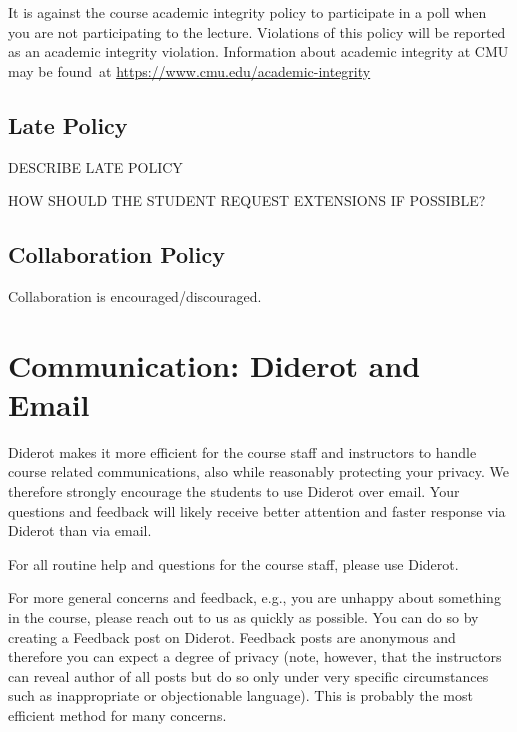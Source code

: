 \begin{gram}
It is against the course academic integrity policy to participate in a poll when you are not participating to the lecture. 
%
Violations of this policy will be reported as an academic integrity violation. Information about academic integrity at CMU may be found at \href{https://www.cmu.edu/academic-integrity}{https://www.cmu.edu/academic-integrity}
\end{gram}

\subsection{Late Policy}

DESCRIBE LATE POLICY

HOW SHOULD THE STUDENT REQUEST EXTENSIONS IF POSSIBLE?

\subsection{ Collaboration Policy}

Collaboration is encouraged/discouraged.


\section{Communication: Diderot and Email}

\begin{gram}
Diderot makes it more efficient for the course staff and instructors
to handle course related communications, also while reasonably
protecting your privacy.
%
We therefore strongly encourage the students to use Diderot over email. 
%
Your questions and feedback will likely receive better attention and
faster response via Diderot than via email.


For all routine help and questions for the course staff, please use Diderot. 

For more general concerns and feedback, e.g., you are unhappy about
something in the course, please reach out to us as quickly as
possible.  You can do so by creating a Feedback post on Diderot.
Feedback posts are anonymous and therefore you can expect a degree of
privacy (note, however, that the instructors can reveal author of all
posts but do so only under very specific circumstances such as
inappropriate or objectionable language).  This is probably the most
efficient method for many concerns.  

\end{gram}

